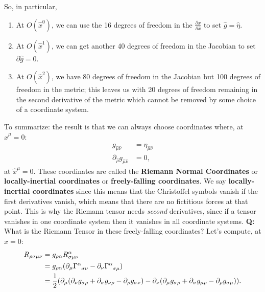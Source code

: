 \documentclass[11pt]{article}
\newcommand{\jac}[0]{\frac{\partial x}{\partial \hat{x}}}
\theoremstyle{definition}
\begin{document}
So, in particular, 
\begin{enumerate}[noitemsep]
	\item At \( O(\hat{x}^0) \), we can use the 16 degrees of freedom in the \( \jac \) to set \( \hat{g} = \hat{\eta} \). 
	\item At \(  O(\hat{x}^1) \), we can get another 40 degrees of freedom in the Jacobian to set \( \partial \hat{g} = 0 \).  
	\item At \(  O(\hat{x}^2) \), we have 80 degrees of freedom in the Jacobian but 100 degrees of freedom in the metric; this leaves us with 20 degrees of freedom remaining in the second derivative of the metric which cannot be removed by some choice of a coordinate system. 
\end{enumerate}
To summarize: the result is that we can always choose coordinates where, at \( \hat{x}^\mu = 0 \): 
\begin{align*}
	g_{\hat{\mu} \hat{\nu}} & = \eta_{\hat{\mu} \hat{\nu}} \\
	\partial_{\hat{\rho}} g_{\hat{\mu} \hat{\nu}} & = 0,
\end{align*}
at \( \hat{x}^\mu = 0 \). These coordinates are called the \textbf{Riemann Normal Coordinates} or \textbf{locally-inertial coordinates} or \textbf{freely-falling coordinates}. We say \textbf{locally-inertial coordinates} since this means that the Christoffel symbols vanish if the first derivatives vanish, which means that there are no fictitious forces at that point. This is why the Riemann tensor needs \emph{second} derivatives, since if a tensor vanishes in one coordinate system then it vanishes in all coordinate systems. 
\newline
\newline
\textbf{Q:} What is the Riemann Tensor in these freely-falling coordinates? 
\newline
\newline
Let's compute, at \( \hat{x} = 0 \): 
\begin{align*}
	R_{\rho \sigma \mu \nu} & = g_{\rho \alpha} R^{\alpha}_{\sigma \mu \nu} \\
	& = g_{\rho \alpha} ( \partial_\mu \tensor{\Gamma}{^\alpha_{\sigma \nu}} - \partial_\nu \tensor{\Gamma}{^\alpha_{\sigma \mu}} ) \\
	& = \frac{1}{2} ( \partial_\mu( \partial_\nu g_{\sigma \rho} + \partial_\sigma g_{\nu \rho}  - \partial_\rho g_{\sigma \nu} ) - \partial_\nu ( \partial_\mu g_{\sigma \rho}  + \partial_\sigma g_{\mu \rho} - \partial_\rho g_{\sigma \mu} )  ). 
\end{align*}
\end{document}
